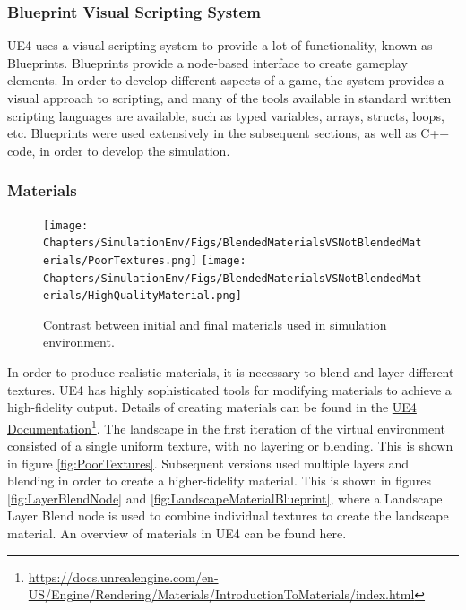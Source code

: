 
\subsubsection{Blueprint Visual Scripting System}
UE4 uses a visual scripting system to provide a lot of functionality, known as Blueprints. Blueprints provide a node-based interface to create gameplay elements. In order to develop different aspects of a game, the system provides a visual approach to scripting, and many of the tools available in standard written scripting languages are available, such as typed variables, arrays, structs, loops, etc. Blueprints were used extensively in the subsequent sections, as well as C++ code, in order to develop the simulation.


\subsubsection{Materials}


\begin{figure}
    \centering
    \texttt{[image: Chapters/SimulationEnv/Figs/BlendedMaterialsVSNotBlendedMaterials/PoorTextures.png]}
    \label{fig:PoorTextures}
    \texttt{[image: Chapters/SimulationEnv/Figs/BlendedMaterialsVSNotBlendedMaterials/HighQualityMaterial.png]}
    \label{fig:GoodTextures}
    \caption{Contrast between initial and final materials used in simulation environment.}
\end{figure}


In order to produce realistic materials, it is necessary to blend and layer different textures. UE4 has highly sophisticated tools for modifying materials to achieve a high-fidelity output. Details of creating materials can be found in the 
\href{https://docs.unrealengine.com/en-US/Engine/Rendering/Materials/IntroductionToMaterials/index.html}{UE4 Documentation}\footnote{\href {https://docs.unrealengine.com/en-US/Engine/Rendering/Materials/IntroductionToMaterials/index.html}{https://docs.unrealengine.com/en-US/Engine/Rendering/Materials/IntroductionToMaterials/index.html}}. The landscape in the first iteration of the virtual environment consisted of a single uniform texture, with no layering or blending. This is shown in figure \ref{fig:PoorTextures}. Subsequent versions used multiple layers and blending in order to create a higher-fidelity material. This is shown in figures \ref{fig:LayerBlendNode} and \ref{fig:LandscapeMaterialBlueprint}, where a Landscape Layer Blend node is used to combine individual textures to create the landscape material. An overview of materials in UE4 can be found here. 

